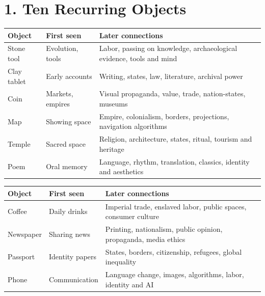 \section*{1. Ten Recurring Objects}
\noindent
\begin{tabularx}{\linewidth}{llX}
\toprule
Object & First seen & Later connections \\
\midrule
Stone tool & Evolution, tools & Labor, passing on knowledge, archaeological evidence, tools and mind \\
Clay tablet & Early accounts & Writing, states, law, literature, archival power \\
Coin & Markets, empires & Visual propaganda, value, trade, nation-states, museums \\
Map & Showing space & Empire, colonialism, borders, projections, navigation algorithms \\
Temple & Sacred space & Religion, architecture, states, ritual, tourism and heritage \\
Poem & Oral memory & Language, rhythm, translation, classics, identity and aesthetics \\
\bottomrule
\end{tabularx}

\noindent
\begin{tabularx}{\linewidth}{llX}
\toprule
Object & First seen & Later connections \\
\midrule
Coffee & Daily drinks & Imperial trade, enslaved labor, public spaces, consumer culture \\
Newspaper & Sharing news & Printing, nationalism, public opinion, propaganda, media ethics \\
Passport & Identity papers & States, borders, citizenship, refugees, global inequality \\
Phone & Communication & Language change, images, algorithms, labor, identity and AI \\
\bottomrule
\end{tabularx}
